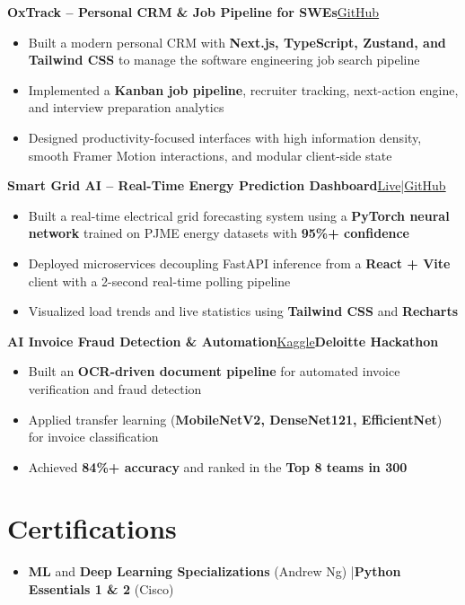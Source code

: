 \documentclass[a4paper,11pt]{article}
\newcommand{\proj}[2]{\vspace{4pt}\textbf{#1}\hfill{\small #2}\par\vspace{1pt}}
\begin{document}
\proj{OxTrack -- Personal CRM \& Job Pipeline for SWEs}{\href{https://github.com/pranav172/oxTrack}{GitHub}}
\begin{itemize}
    \item Built a modern personal CRM with \textbf{Next.js, TypeScript, Zustand, and Tailwind CSS} to manage the software engineering job search pipeline
    \item Implemented a \textbf{Kanban job pipeline}, recruiter tracking, next-action engine, and interview preparation analytics
    \item Designed productivity-focused interfaces with high information density, smooth Framer Motion interactions, and modular client-side state
\end{itemize}

\proj{Smart Grid AI -- Real-Time Energy Prediction Dashboard}{\href{https://smart-grid-ai.vercel.app/}{Live}\hspace{0.4em}|\hspace{0.4em}\href{https://github.com/pranav172/smart-grid-ai}{GitHub}}
\begin{itemize}
    \item Built a real-time electrical grid forecasting system using a \textbf{PyTorch neural network} trained on PJME energy datasets with \textbf{95\%+ confidence}
    \item Deployed microservices decoupling FastAPI inference from a \textbf{React + Vite} client with a 2-second real-time polling pipeline
    \item Visualized load trends and live statistics using \textbf{Tailwind CSS} and \textbf{Recharts}
\end{itemize}

\proj{AI Invoice Fraud Detection \& Automation}{\href{https://www.kaggle.com/code/pranav1718/invoicefrauddetection}{Kaggle}\hspace{0.6em}\textbf{Deloitte Hackathon}}
\begin{itemize}
    \item Built an \textbf{OCR-driven document pipeline} for automated invoice verification and fraud detection
    \item Applied transfer learning (\textbf{MobileNetV2, DenseNet121, EfficientNet}) for invoice classification
    \item Achieved \textbf{84\%+ accuracy} and ranked in the \textbf{Top 8 teams in 300}
\end{itemize}

\section*{Certifications}

\begin{itemize}
    \item \textbf{ML} and \textbf{Deep Learning Specializations} (Andrew Ng) \quad|\quad \textbf{Python Essentials 1 \& 2} (Cisco)
\end{itemize}
\end{document}
